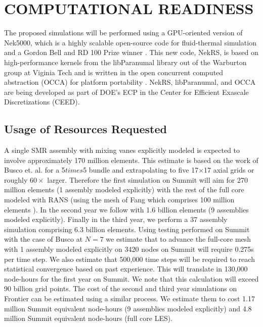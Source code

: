 \vspace{-.25in}
\section{COMPUTATIONAL READINESS} %
\vspace{-.2in}

The proposed simulations will be performed using a GPU-oriented version of
Nek5000, which is a highly scalable open-source code for fluid-thermal
simulation and a Gordon Bell and RD 100 Prize winner \cite{tufo99a}.  This new
code, NekRS, is based on high-performance kernels from the libParanumal library
out of the Warburton group at Viginia Tech
\cite{ChalmersKarakusAustinSwirydowiczWarburton2020,streamParanumal2020} and is
written in the open concurrent computed abstraction (OCCA) for platform
portability \cite{occa}.  NekRS, libParanumal, and OCCA are being developed as
part of DOE's ECP in the Center for Efficient Exascale Discretizations (CEED). 

\vspace{-.25in}
\subsection{Usage of Resources Requested }
\vspace{-.2in}

A single SMR assembly with mixing vanes explicitly modeled is expected to
involve approximately 170 million elements. This estimate is based on the work
of Busco et. al. \cite{busco2019invariant} for a 5$times$5 bundle and extrapolating
to five 17$\times$17 axial grids or roughly $60 \times$ larger.
%
Therefore the first simulation on Summit will aim for 270 million elements (1
assembly modeled explicitly) with the rest of the full core modeled with RANS
(using the mesh of Fang which comprises 100  million elements \cite{Fang2021}).
In the second year we follow with 1.6 billion elements (9 assemblies modeled
explicitly).  Finally in the third year, we perform a 37 assembly simulation
comprising 6.3 billion elements.
%
Using testing performed on Summit with the case of Busco
\cite{fischer2021nekrs} at $N=7$ we estimate that to advance the full-core mesh
with 1 assembly modeled explicitly on 3420 nodes on Summit will require 0.275s
per time step. We also estimate that 500,000 time steps will be required to
reach statistical convergence based on past experience. This will translate in
130,000 node-hours for the first year on Summit. We note that this calculation
will exceed 90 billion grid points.
%
The cost of the second and third year simulations on Frontier can be estimated
using a similar process. We estimate them to cost 1.17 million Summit
equivalent node-hours (9 assemblies modeled explicitly) and 4.8 million Summit
equivalent node-hours (full core LES).


